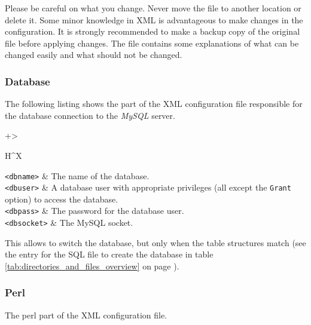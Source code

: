 \documentclass[a4paper,10pt,twoside,titlepage,headings=small,bibliography=totocnumbered,headsepline]{scrartcl}
\begin{document}
\begin{appendix}
Please be careful on what you change. Never move the file to another location or delete it. Some minor knowledge in XML is advantageous to make changes in the configuration. It is strongly recommended to make a backup copy of the original file before applying changes. The file contains some explanations of what can be changed easily and what should not be changed.

\numcodestyle
\lstset{language=XML}    

\subsubsection{Database}
\label{app:configdb}

The following listing shows the part of the XML configuration file responsible for the database connection to the \textit{MySQL} server. 



\begin{center} 
\renewcommand\arraystretch{2}
\begin{tabularx}{\textwidth}{+>{\raggedright\arraybackslash}H^X}
\lstinline|<dbname>|	&	The name of the database. \\ 
\lstinline|<dbuser>|	&	A database user with appropriate privileges (all except the \lstinline|Grant| option) to access the database. \\
\lstinline|<dbpass>|	&	The password for the database user. \\ 
\lstinline|<dbsocket>|	&	The MySQL socket. \\ 
\end{tabularx}
\label{tab:database_config}
\end{center}

This allows to switch the database, but only when the table structures match (see the entry for the SQL file to create the database in table \ref{tab:directories_and_files_overview} on page \pageref{tab:directories_and_files_overview}).

\pagebreak

\subsubsection{Perl}
\label{app:configperl}

The perl part of the XML configuration file.


\end{appendix}
\end{document}
